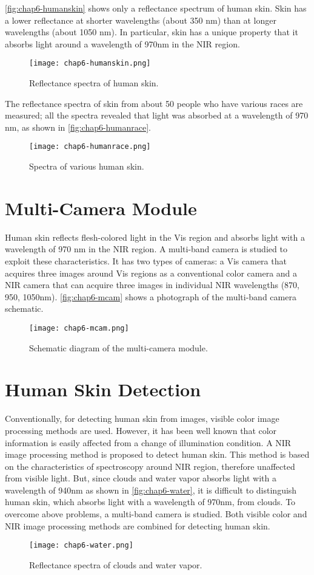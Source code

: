 \autoref{fig:chap6-humanskin} shows only a reflectance spectrum of human
skin. Skin has a lower reflectance at shorter wavelengths (about 350 nm) than at 
longer wavelengths (about 1050 nm). In particular, skin has a unique
property that it absorbs light around a wavelength of 970nm in the NIR region. 
\begin{figure}[ht]
  \label{fig:chap6-humanskin}
  \centering
	\texttt{[image: chap6-humanskin.png]}
	\caption{Reflectance spectra of human skin.}
\end{figure}

The reflectance spectra of skin from about 50 people who have various
races are measured; all the spectra revealed that light was absorbed
at a wavelength of 970 nm, as shown in \autoref {fig:chap6-humanrace}.

\begin{figure}[h]
  \label{fig:chap6-humanrace}
  \centering
	\texttt{[image: chap6-humanrace.png]}
	\caption{Spectra of various human skin.}
\end{figure}

\section{Multi-Camera Module}
Human skin reflects flesh-colored light in the Vis region and absorbs light 
with a wavelength of 970 nm in the NIR region. A multi-band camera is studied to
exploit these characteristics. It has two types of cameras: a Vis camera that 
acquires three images around Vis regions as a conventional color camera and 
a NIR camera that can acquire three images in individual NIR wavelengths (870, 950,
1050nm). \autoref{fig:chap6-mcam} shows a photograph of the multi-band camera schematic.

\begin{figure}[hb]
  \label{fig:chap6-mcam}
  \centering
	\texttt{[image: chap6-mcam.png]}
	\caption{Schematic diagram of the multi-camera module.}
\end{figure}

\section {Human Skin Detection}
Conventionally, for detecting human skin from images, 
visible color image processing methods are used.
However, it has been well known that color information is easily affected 
from a change of illumination condition. A NIR image processing method is proposed 
to detect human skin. This method is based on the characteristics of spectroscopy
around NIR region, therefore unaffected from visible
light. But, since clouds and water vapor absorbs light
with a wavelength of 940nm as shown in \autoref {fig:chap6-water}, 
it is difficult to distinguish human skin, which absorbs light with a wavelength 
of 970nm, from clouds. To overcome above problems, a multi-band camera is studied.
Both visible color and NIR image processing methods are combined for detecting 
human skin.

\begin{figure}[hb]
  \label{fig:chap6-water}
  \centering
	\texttt{[image: chap6-water.png]}
	\caption{Reflectance spectra of clouds and water vapor.}
\end{figure}
